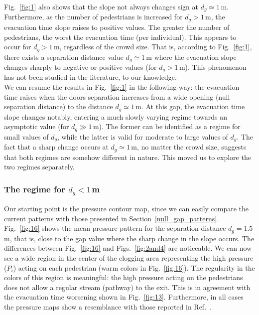 Fig.~\ref{fig:1} also shows that the slope not always changes sign  
at $d_g\simeq1\,$m. Furthermore, as the number of pedestrians is increased for 
$d_g>1\,$m, the evacuation time slope raises to positive values. The 
greater the number of pedestrians, the worst the evacuation time (per 
individual). This appears to occur for $d_g>1\,$m, regardless of the crowd 
size. That is, according to Fig.~\ref{fig:1}, there exists a separation 
distance value $d_g\simeq1\,$m where the evacuation slope changes sharply 
to negative or positive values (for $d_g>1\,$m). This phenomenon has not been 
studied in the literature, to our knowledge. \\

We can resume the results in Fig.~\ref{fig:1} in the following way: the 
evacuation time raises when the doors separation increases from a wide opening 
(null separation distance) to the distance $d_g\simeq1\,$m. At this gap, the 
evacuation time slope changes notably, entering a much slowly 
varying regime towards an asymptotic value (for $d_g\gg1\,$m).  The former can 
be identified as a regime for small values of $d_g$, while the latter is valid 
for moderate to large values of $d_g$. The fact that a sharp change occurs at 
$d_g\simeq1\,$m, no matter the crowd size, suggests that both regimes are 
somehow different in nature. This moved us to explore the two regimes 
separately. \\

\subsubsection{\label{small_regime} The regime for $d_g<1\,$m}

Our starting point is the pressure contour map, since we can easily compare the 
current patterns with those presented in Section~\ref{null_gap_patterns}. 
Fig.~\ref{fig:16} shows the mean pressure pattern for the separation distance 
$d_g=1.5\,$m, that is, close to the gap value where the sharp change in the 
slope occurs. The differences between Fig.~\ref{fig:16} and 
Figs.~\ref{fig:2and4} are noticeable. We can now see a wide region in the center of 
the clogging area representing the high pressure ($P_i$) acting 
on each pedestrian (warm colors in Fig.~\ref{fig:16}). The regularity in the 
colors of this region is meaningful: the high pressure acting on the pedestrians 
does not allow a regular stream (pathway) to the exit. This is in agreement with 
the evacuation time worsening shown in Fig.~\ref{fig:13}. Furthermore, in all cases the pressure maps show a resemblance with those reported in Ref.~\cite{Zhang}.\\

